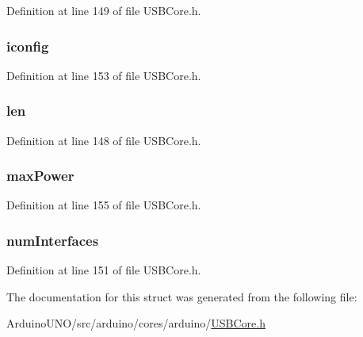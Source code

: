 Definition at line 149 of file U\+S\+B\+Core.\+h.

\hypertarget{struct_config_descriptor_aa15641f1c55e92825e8ba97b1dc504a1}{}
\subsubsection[{iconfig}]{ iconfig}\label{struct_config_descriptor_aa15641f1c55e92825e8ba97b1dc504a1}


Definition at line 153 of file U\+S\+B\+Core.\+h.

\hypertarget{struct_config_descriptor_afbf3f3230446569534d5f466aaf4c23b}{}
\subsubsection[{len}]{ len}\label{struct_config_descriptor_afbf3f3230446569534d5f466aaf4c23b}


Definition at line 148 of file U\+S\+B\+Core.\+h.

\hypertarget{struct_config_descriptor_a081afc2b5fe7d7e625c612cc09b17015}{}
\subsubsection[{max\+Power}]{ max\+Power}\label{struct_config_descriptor_a081afc2b5fe7d7e625c612cc09b17015}


Definition at line 155 of file U\+S\+B\+Core.\+h.

\hypertarget{struct_config_descriptor_a14f358f5820bd4d472a16cbe4ca8cee9}{}
\subsubsection[{num\+Interfaces}]{ num\+Interfaces}\label{struct_config_descriptor_a14f358f5820bd4d472a16cbe4ca8cee9}


Definition at line 151 of file U\+S\+B\+Core.\+h.



The documentation for this struct was generated from the following file\+:\begin{DoxyCompactItemize}
\item 
Arduino\+U\+N\+O/src/arduino/cores/arduino/\hyperlink{_u_s_b_core_8h}{U\+S\+B\+Core.\+h}\end{DoxyCompactItemize}
